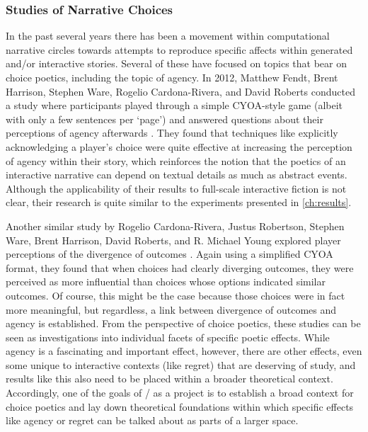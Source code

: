 


\subsubsection{Studies of Narrative Choices}

In the past several years there has been a movement within computational narrative circles towards attempts to reproduce specific affects within generated and/or interactive stories.
%
Several of these have focused on topics that bear on choice poetics, including the topic of agency.
%
In 2012, Matthew Fendt, Brent Harrison, Stephen Ware, Rogelio Cardona-Rivera, and David Roberts conducted a study where participants played through a simple CYOA-style game (albeit with only a few sentences per `page') and answered questions about their perceptions of agency afterwards \citep{Fendt2012}.
%
They found that techniques like explicitly acknowledging a player's choice were quite effective at increasing the perception of agency within their story, which reinforces the notion that the poetics of an interactive narrative can depend on textual details as much as abstract events.
%
Although the applicability of their results to full-scale interactive fiction is not clear, their research is quite similar to the experiments presented in \cref{ch:results}.


Another similar study by Rogelio Cardona-Rivera, Justus Robertson, Stephen Ware, Brent Harrison, David Roberts, and R. Michael Young explored player perceptions of the divergence of outcomes \citep{Cardona-Rivera2014}.
%
Again using a simplified CYOA format, they found that when choices had clearly diverging outcomes, they were perceived as more influential than choices whose options indicated similar outcomes.
%
Of course, this might be the case because those choices were in fact more meaningful, but regardless, a link between divergence of outcomes and agency is established.
%
From the perspective of choice poetics, these studies can be seen as investigations into individual facets of specific poetic effects.
%
While agency is a fascinating and important effect, however, there are other effects, even some unique to interactive contexts (like regret) that are deserving of study, and results like this also need to be placed within a broader theoretical context.
%
Accordingly, one of the goals of \dunyazad/ as a project is to establish a broad context for choice poetics and lay down theoretical foundations within which specific effects like agency or regret can be talked about as parts of a larger space.



